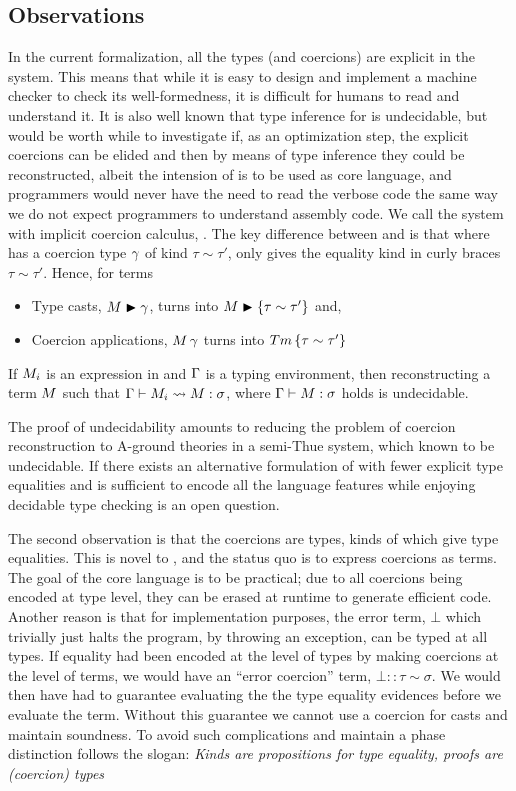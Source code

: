 \documentclass[screen,nonacm,manuscript,review]{acmart} %
\begin{document}
\subsection{Observations}
In the current formalization, all the types (and coercions) are explicit in the system. This means that while it is easy to design and implement a machine checker to check its well-formedness, it is difficult for humans to read and understand it. It is also well known that type inference for \SF is undecidable\cite{wells_typability_1999}, but would be worth while to investigate if, as an optimization step, the explicit coercions can be elided and then by means of type inference they could be reconstructed, albeit the intension of \SFC is to be used as core language, and programmers would never have the need to read the verbose code the same way we do not expect programmers to understand assembly code. We call the system with implicit coercion calculus, \SFCi. The key difference between \SFC and \SFCi is that where \SFC has a coercion type $\gamma$ of kind $\tau\sim\tau'$, \SFCi only gives the equality kind in curly braces $\tau\sim\tau'$. Hence, for terms
\begin{itemize}
\item Type casts, $M\mathrel{\blacktriangleright}\gamma$, turns into $M\mathrel{\blacktriangleright}\{\tau \sim \tau'\}$ and,
\item Coercion applications, $M\,\gamma$ turns into $Tm\,\{\tau \sim \tau'\}$
\end{itemize}
\begin{theorem}
 If $M_i$ is an expression in \SFCi and $\Gamma$ is a typing environment, then reconstructing a \SFC term $M$ such that $\Gamma \vdash M_i \rightsquigarrow M : \sigma$, where $\Gamma \vdash M : \sigma$ holds is undecidable.
\end{theorem}
The proof of undecidability amounts to reducing the problem of coercion reconstruction to A-ground theories in a semi-Thue system, which known to be undecidable\cite{post_recursive_1947}. If there exists an alternative formulation of \SFCi with fewer explicit type equalities and is sufficient to encode all the language features while enjoying decidable type checking is an open question.

The second observation is that the coercions are types, kinds of which
give type equalities. This is novel to \SFC, and the status quo is to
express coercions as terms. The goal of the core language is to be
practical; due to all coercions being encoded at type level, they can
be erased at runtime to generate efficient code. Another reason is
that for implementation purposes, the error term, $\bot$ which
trivially just halts the program, by throwing an exception, can be
typed at all types. If equality had been encoded at the level of types
by making coercions at the level of terms, we would have an ``error
coercion'' term, $\bot :: \tau \sim \sigma$. We would then have had to
guarantee evaluating the the type equality evidences before we
evaluate the term. Without this guarantee we cannot use a coercion for
casts and maintain soundness. To avoid such complications and maintain
a phase distinction \SFC follows the slogan: \emph{Kinds are
  propositions for type equality, proofs are (coercion) types}
\end{document}

